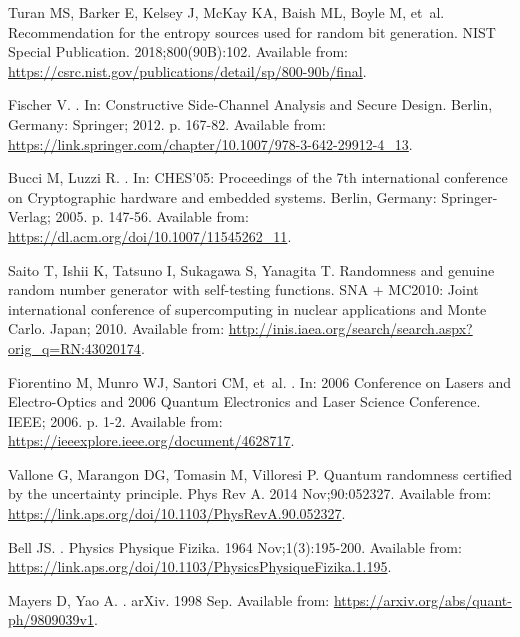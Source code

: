 \documentclass[]{interact}
\theoremstyle{plain}%
\theoremstyle{definition}
\theoremstyle{remark}
\begin{document}
\begin{thebibliography}{100}
Turan MS, Barker E, Kelsey J, McKay KA, Baish ML, Boyle M, et~al.
\newblock Recommendation for the entropy sources used for random bit
  generation.
\newblock NIST Special Publication. 2018;800(90B):102.
\newblock Available from:
  \url{https://csrc.nist.gov/publications/detail/sp/800-90b/final}.

Fischer V.
.
\newblock In: {Constructive Side-Channel Analysis and Secure Design}. Berlin,
  Germany: Springer; 2012. p. 167-82.
\newblock Available from:
  \url{https://link.springer.com/chapter/10.1007/978-3-642-29912-4_13}.

Bucci M, Luzzi R.
.
\newblock In: {CHES'05: Proceedings of the 7th international conference on
  Cryptographic hardware and embedded systems}. Berlin, Germany:
  Springer-Verlag; 2005. p. 147-56.
\newblock Available from: \url{https://dl.acm.org/doi/10.1007/11545262_11}.

Saito T, Ishii K, Tatsuno I, Sukagawa S, Yanagita T.
\newblock Randomness and genuine random number generator with self-testing
  functions.
\newblock SNA + MC2010: Joint international conference of supercomputing in
  nuclear applications and Monte Carlo. Japan; 2010. Available from:
  \url{http://inis.iaea.org/search/search.aspx?orig_q=RN:43020174}.

Fiorentino M, Munro WJ, Santori CM, et~al.
.
\newblock In: {2006 Conference on Lasers and Electro-Optics and 2006 Quantum
  Electronics and Laser Science Conference}. IEEE; 2006. p. 1-2.
\newblock Available from: \url{https://ieeexplore.ieee.org/document/4628717}.

Vallone G, Marangon DG, Tomasin M, Villoresi P.
\newblock Quantum randomness certified by the uncertainty principle.
\newblock Phys Rev A. 2014 Nov;90:052327.
\newblock Available from:
  \url{https://link.aps.org/doi/10.1103/PhysRevA.90.052327}.

Bell JS.
.
\newblock Physics Physique Fizika. 1964 Nov;1(3):195-200.
\newblock Available from:
  \url{https://link.aps.org/doi/10.1103/PhysicsPhysiqueFizika.1.195}.

Mayers D, Yao A.
.
\newblock arXiv. 1998 Sep.
\newblock Available from: \url{https://arxiv.org/abs/quant-ph/9809039v1}.


\end{thebibliography}
\end{document}
